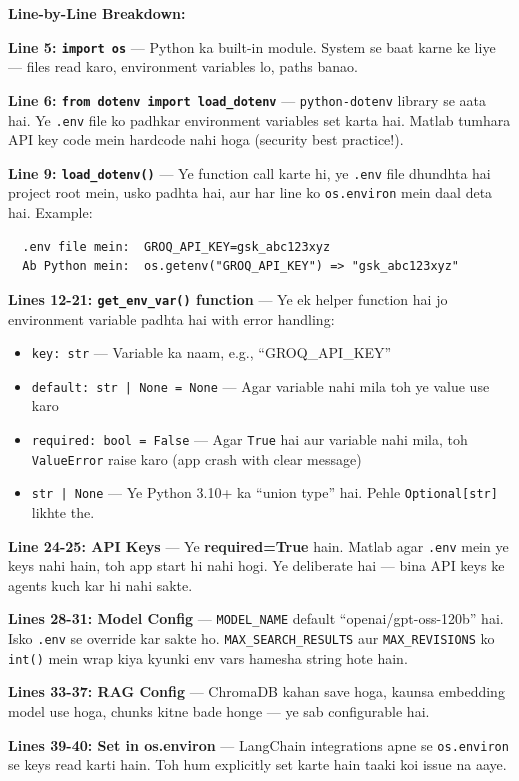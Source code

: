 \documentclass[12pt, a4paper]{article}
\begin{document}
\begin{codestorybox}
\textbf{Line-by-Line Breakdown:}

\textbf{Line 5: \texttt{import os}} --- Python ka built-in module. System se baat karne ke liye --- files read karo, environment variables lo, paths banao.

\textbf{Line 6: \texttt{from dotenv import load\_dotenv}} --- \texttt{python-dotenv} library se aata hai. Ye \texttt{.env} file ko padhkar environment variables set karta hai. Matlab tumhara API key code mein hardcode nahi hoga (security best practice!).

\textbf{Line 9: \texttt{load\_dotenv()}} --- Ye function call karte hi, ye \texttt{.env} file dhundhta hai project root mein, usko padhta hai, aur har line ko \texttt{os.environ} mein daal deta hai. Example:
\begin{verbatim}
  .env file mein:  GROQ_API_KEY=gsk_abc123xyz
  Ab Python mein:  os.getenv("GROQ_API_KEY") => "gsk_abc123xyz"
\end{verbatim}

\textbf{Lines 12-21: \texttt{get\_env\_var()} function} --- Ye ek helper function hai jo environment variable padhta hai with error handling:
\begin{itemize}[leftmargin=*]
\item \texttt{key: str} --- Variable ka naam, e.g., ``GROQ\_API\_KEY''
\item \texttt{default: str | None = None} --- Agar variable nahi mila toh ye value use karo
\item \texttt{required: bool = False} --- Agar \texttt{True} hai aur variable nahi mila, toh \texttt{ValueError} raise karo (app crash with clear message)
\item \texttt{str | None} --- Ye Python 3.10+ ka ``union type'' hai. Pehle \texttt{Optional[str]} likhte the.
\end{itemize}

\textbf{Line 24-25: API Keys} --- Ye \textbf{required=True} hain. Matlab agar \texttt{.env} mein ye keys nahi hain, toh app start hi nahi hogi. Ye deliberate hai --- bina API keys ke agents kuch kar hi nahi sakte.

\textbf{Lines 28-31: Model Config} --- \texttt{MODEL\_NAME} default ``openai/gpt-oss-120b'' hai. Isko \texttt{.env} se override kar sakte ho. \texttt{MAX\_SEARCH\_RESULTS} aur \texttt{MAX\_REVISIONS} ko \texttt{int()} mein wrap kiya kyunki env vars hamesha string hote hain.

\textbf{Lines 33-37: RAG Config} --- ChromaDB kahan save hoga, kaunsa embedding model use hoga, chunks kitne bade honge --- ye sab configurable hai.

\textbf{Lines 39-40: Set in os.environ} --- LangChain integrations apne se \texttt{os.environ} se keys read karti hain. Toh hum explicitly set karte hain taaki koi issue na aaye.
\end{codestorybox}
\end{document}
